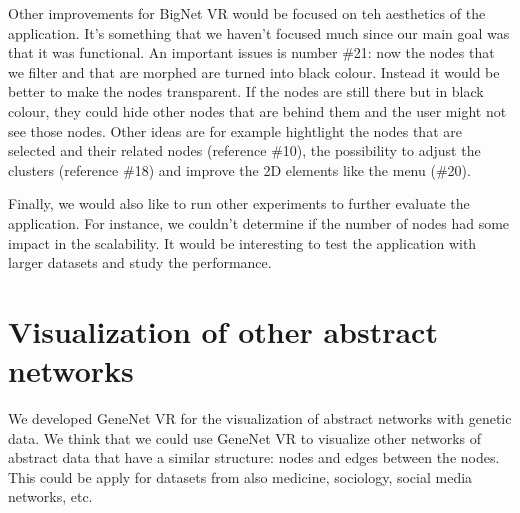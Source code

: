 Other improvements for BigNet VR would be focused on teh aesthetics of the application. It's something that we haven't focused much since our main goal was that it was functional. An important issues is number \#21: now the nodes that we filter and that are morphed are turned into black colour. Instead it would be better to make the nodes transparent. If the nodes are still there but in black colour, they could hide other nodes that are behind them and the user might not see those nodes. Other ideas are for example hightlight the nodes that are selected and their related nodes (reference \#10), the possibility to adjust the clusters (reference \#18) and improve the 2D elements like the menu (\#20).

Finally, we would also like to run other experiments to further evaluate the application. For instance, we couldn't determine if the number of nodes had some impact in the scalability. It would be interesting to test the application with larger datasets and study the performance.

\section{Visualization of other abstract networks}
We developed GeneNet VR for the visualization of abstract networks with genetic data. We think that we could use GeneNet VR to visualize other networks of abstract data that have a similar structure: nodes and edges between the nodes. This could be apply for datasets from also medicine, sociology, social media networks, etc.
